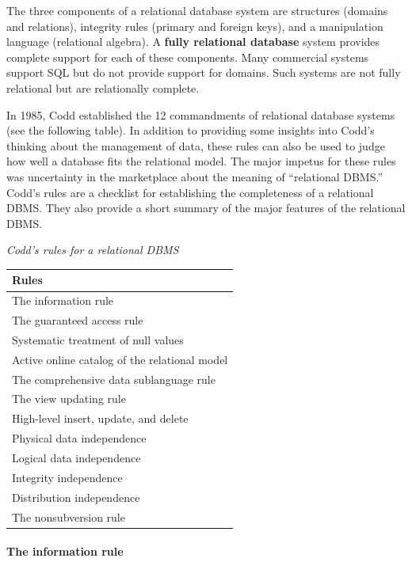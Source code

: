 \documentclass[
]{article}
\begin{document}
The three components of a relational database system are structures
(domains and relations), integrity rules (primary and foreign keys), and
a manipulation language (relational algebra). A \textbf{fully relational
database} system provides complete support for each of these
components. Many commercial systems support SQL but do not provide
support for domains. Such systems are not fully relational but are
relationally complete.

In 1985, Codd established the 12 commandments of relational database
systems (see the following table). In addition to providing some
insights into Codd's thinking about the management of data, these rules
can also be used to judge how well a database fits the relational model.
The major impetus for these rules was uncertainty in the marketplace
about the meaning of ``relational DBMS.'' Codd's rules are a checklist for
establishing the completeness of a relational DBMS. They also provide a
short summary of the major features of the relational DBMS.

\emph{Codd's rules for a relational DBMS}

\begin{longtable}[]{@{}l@{}}
\toprule
Rules \\
\midrule
\endhead
The information rule \\
The guaranteed access rule \\
Systematic treatment of null values \\
Active online catalog of the relational model \\
The comprehensive data sublanguage rule \\
The view updating rule \\
High-level insert, update, and delete \\
Physical data independence \\
Logical data independence \\
Integrity independence \\
Distribution independence \\
The nonsubversion rule \\
\bottomrule
\end{longtable}

\hypertarget{the-information-rule}{%
\paragraph*{The information rule}\label{the-information-rule}}
\end{document}
